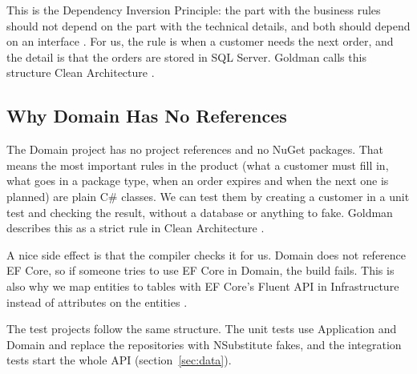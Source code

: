 \documentclass[a4paper,11pt]{article}
\begin{document}
This is the Dependency Inversion Principle: the part with the business rules should not depend on the part with the technical details, and both should depend on an interface \cite[ch.~4, pp.~139--141]{freeman-head-first-design-patterns}. For us, the rule is when a customer needs the next order, and the detail is that the orders are stored in SQL Server. Goldman calls this structure Clean Architecture \cite[sec.~8.4.1]{goldman-maui-in-action}.

\subsection{Why Domain Has No References}
The Domain project has no project references and no NuGet packages. That means the most important rules in the product (what a customer must fill in, what goes in a package type, when an order expires and when the next one is planned) are plain C\# classes. We can test them by creating a customer in a unit test and checking the result, without a database or anything to fake. Goldman describes this as a strict rule in Clean Architecture \cite[sec.~8.4.2, p.~262]{goldman-maui-in-action}.

A nice side effect is that the compiler checks it for us. Domain does not reference EF Core, so if someone tries to use EF Core in Domain, the build fails. This is also why we map entities to tables with EF Core's Fluent API in Infrastructure instead of attributes on the entities \cite[sec.~4.3.3]{desanctis-web-apis-aspnet-core}.

The test projects follow the same structure. The unit tests use Application and Domain and replace the repositories with NSubstitute fakes, and the integration tests start the whole API (section~\ref{sec:data}).
\end{document}
